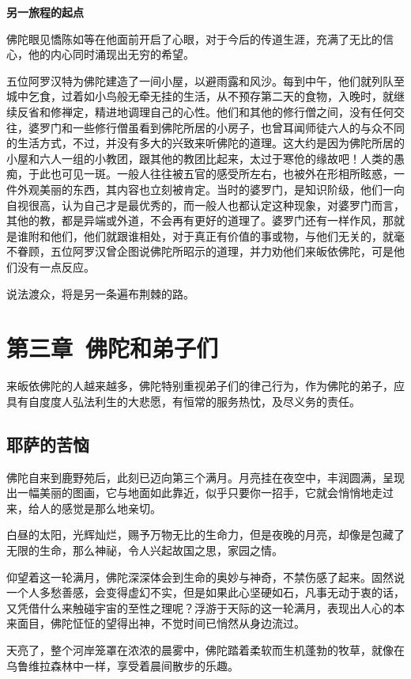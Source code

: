 \documentclass[twoside,openany]{book}
\newcommand{\mt}[1]{\textbullet \textbf{#1}}
\begin{document}
\mt{另一旅程的起点}

佛陀眼见憍陈如等在他面前开启了心眼，对于今后的传道生涯，充满了无比的信心，他的内心同时涌现出无穷的希望。

五位阿罗汉特为佛陀建造了一间小屋，以避雨露和风沙。每到中午，他们就列队至城中乞食，过着如小鸟般无牵无挂的生活，从不预存第二天的食物，入晚时，就继续反省和修禅定，精进地调理自己的心性。他们和其他的修行僧之间，没有任何交往，婆罗门和一些修行僧虽看到佛陀所居的小房子，也曾耳闻师徒六人的与众不同的生活方式，不过，并没有多大的兴致来听佛陀的道理。这大约是因为佛陀所居的小屋和六人一组的小教团，跟其他的教团比起来，太过于寒伧的缘故吧！人类的愚痴，于此也可见一斑。一般人往往被五官的感受所左右，也被外在形相所眩惑，一件外观美丽的东西，其内容也立刻被肯定。当时的婆罗门，是知识阶级，他们一向自视很高，认为自己才是最优秀的，而一般人也都认定这种现象，对婆罗门而言，其他的教，都是异端或外道，不会再有更好的道理了。婆罗门还有一样作风，那就是谁附和他们，他们就跟谁相处，对于真正有价值的事或物，与他们无关的，就毫不眷顾，五位阿罗汉曾企图说佛陀所昭示的道理，并力劝他们来皈依佛陀，可是他们没有一点反应。

说法渡众，将是另一条遍布荆棘的路。	



\chapter{第三章\ 佛陀和弟子们}\label{ch3}
来皈依佛陀的人越来越多，佛陀特别重视弟子们的律己行为，作为佛陀的弟子，应具有自度度人弘法利生的大悲愿，有恒常的服务热忱，及尽义务的责任。

\newpage
\section{耶萨的苦恼}\label{sec3.1}

佛陀自来到鹿野苑后，此刻已迈向第三个满月。月亮挂在夜空中，丰润圆满，呈现出一幅美丽的图画，它与地面如此靠近，似乎只要你一招手，它就会悄悄地走过来，给人的感觉是那么地亲切。

白昼的太阳，光辉灿烂，赐予万物无比的生命力，但是夜晚的月亮，却像是包藏了无限的生命，那么神祕，令人兴起故国之思，家园之情。

仰望着这一轮满月，佛陀深深体会到生命的奥妙与神奇，不禁伤感了起来。固然说一个人多愁善感，会变得虚幻不实，但是如果此心坚硬如石，凡事无动于衷的话，又凭借什么来触碰宇宙的至性之理呢？浮游于天际的这一轮满月，表现出人心的本来面目，佛陀怔怔的望得出神，不觉时间已悄然从身边流过。

天亮了，整个河岸笼罩在浓浓的晨雾中，佛陀踏着柔软而生机蓬勃的牧草，就像在乌鲁维拉森林中一样，享受着晨间散步的乐趣。
\end{document}

